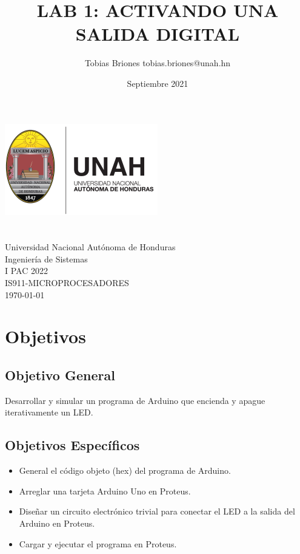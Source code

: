 \documentclass{article}
\title{LAB 1: ACTIVANDO UNA SALIDA DIGITAL}
\author{Tobias Briones \bigbreak tobias.briones@unah.hn}
\date{Septiembre 2021}
\begin{document}
\makeatletter
    \begin{titlepage}
        \begin{center}
            \includegraphics[width=0.3\linewidth]{images/logo-unah.png}\\[4ex]
            {\huge \bfseries \@title 
            \vspace{1cm}}\\[2ex]
            {\LARGE \@author}\\[50ex] 
            
            {\large
            Universidad Nacional Autónoma de Honduras\\
            Ingeniería de Sistemas\\
            I PAC 2022\\
            IS911-MICROPROCESADORES
            }\\[2ex]
            
            {\large \today}
        \end{center}
    \end{titlepage}
\makeatother
\thispagestyle{empty}
\newpage

\section{Objetivos}

\subsection{Objetivo General}

Desarrollar y simular un programa de Arduino que encienda y apague iterativamente un LED.

\subsection{Objetivos Específicos}

\begin{itemize}
    \item General el código objeto (hex) del programa de Arduino.
    \item Arreglar una tarjeta Arduino Uno en Proteus.
    \item Diseñar un circuito electrónico trivial para conectar el LED a la salida del Arduino en Proteus.
    \item Cargar y ejecutar el programa en Proteus.
\end{itemize}
\end{document}
